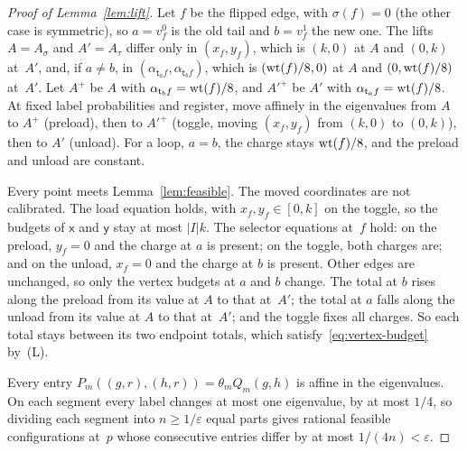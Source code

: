 \begin{proof}[Proof of Lemma~\ref{lem:lift}]
Let $f$ be the flipped edge, with $\sigma(f)=0$ (the other case is
symmetric), so $a=v_f^0$ is the old tail and $b=v_f^1$ the new one. The
lifts $A=A_\sigma$ and $A'=A_\tau$ differ only in $(x_f,y_f)$, which is
$(k,0)$ at $A$ and $(0,k)$ at~$A'$, and, if $a\neq b$, in
$(\alpha_{\mathsf t_af},\alpha_{\mathsf t_bf})$, which is $(\operatorname{wt}(f)/8,0)$ at
$A$ and $(0,\operatorname{wt}(f)/8)$ at~$A'$. Let $A^+$ be $A$ with
$\alpha_{\mathsf t_bf}=\operatorname{wt}(f)/8$, and $A'^+$ be $A'$ with
$\alpha_{\mathsf t_af}=\operatorname{wt}(f)/8$. At fixed label probabilities and
register, move affinely in the eigenvalues from $A$ to $A^+$ (preload),
then to $A'^+$ (toggle, moving $(x_f,y_f)$ from $(k,0)$ to $(0,k)$), then
to $A'$ (unload). For a loop, $a=b$, the charge stays $\operatorname{wt}(f)/8$, and the
preload and unload are constant.

Every point meets Lemma~\ref{lem:feasible}. The moved coordinates are not
calibrated. The load equation holds, with $x_f,y_f\in[0,k]$ on the toggle,
so the budgets of $\mathsf x$ and $\mathsf y$ stay at most $|I|k$. The
selector equations at~$f$ hold: on the preload, $y_f=0$ and the charge at
$a$ is present; on the toggle, both charges are; and on the unload, $x_f=0$
and the charge at $b$ is present. Other edges are unchanged, so only the
vertex budgets at $a$ and $b$ change. The total at $b$ rises along the
preload from its value at $A$ to that at~$A'$; the total at $a$ falls
along the unload from its value at $A$ to that at~$A'$; and the toggle
fixes all charges. So each total stays between its two endpoint totals,
which satisfy~\eqref{eq:vertex-budget} by~(L).

Every entry $P_m((g,r),(h,r))=\theta_mQ_m(g,h)$ is affine in the
eigenvalues. On each segment every label changes at most one eigenvalue,
by at most $1/4$, so dividing each segment into
$n\ge1/\varepsilon$ equal parts gives rational feasible configurations
at~$p$ whose consecutive entries differ by at most $1/(4n)<\varepsilon$.
\end{proof}


